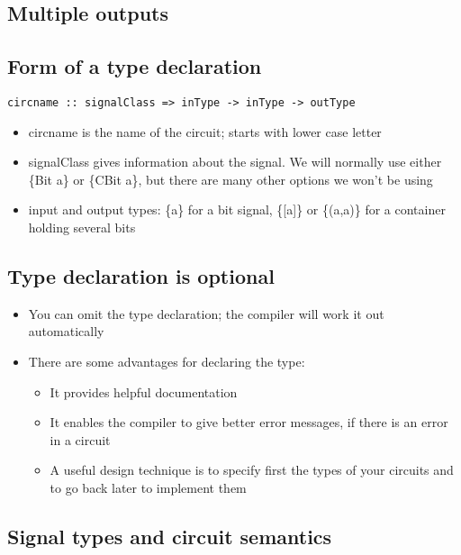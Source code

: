 \documentclass[11pt]{article}
\begin{document}
\subsection{Multiple outputs}
\label{sec:org6dfce22}

\subsection{Form of a type declaration}
\label{sec:org6740cef}

\begin{verbatim}
circname :: signalClass => inType -> inType -> outType
\end{verbatim}

\begin{itemize}
\item circname is the name of the circuit; starts with lower case letter
\item signalClass gives information about the signal.  We will
normally use either \{\color{red}Bit a\} or \{\color{red}CBit a\}, but
there are many other options we won't be using
\item input and output types: \{\color{red}a\} for a bit signal,
\{\color{red}[a]\} or \{\color{red}(a,a)\} for a container holding
several bits
\end{itemize}

\subsection{Type declaration is optional}
\label{sec:orgaa2a116}

\begin{itemize}
\item You can omit the type declaration; the compiler will work it
out automatically
\item There are some advantages for declaring the type:

\begin{itemize}
\item It provides helpful documentation
\item It enables the compiler to give better error messages, if
there is an error in a circuit
\item A useful design technique is to specify first the types of
your circuits and to go back later to implement them
\end{itemize}
\end{itemize}

\subsection{Signal types and circuit semantics}
\label{sec:orgd8c13fa}
\end{document}
